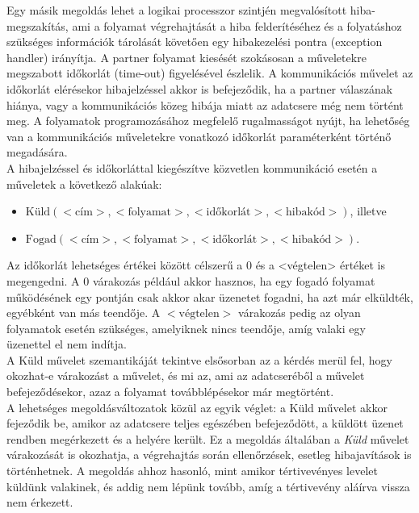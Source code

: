 \documentclass[tikz,12pt,margin=0px]{article}
\begin{document}
    \noindent Egy másik megoldás lehet a logikai processzor szintjén megvalósított hiba-megszakítás, ami a folyamat végrehajtását a hiba felderítéséhez és a folyatáshoz szükséges információk tárolását követően egy hibakezelési pontra (exception handler) irányítja. A partner folyamat kiesését szokásosan a műveletekre megszabott időkorlát (time-out) figyelésével észlelik. A kommunikációs művelet az időkorlát elérésekor hibajelzéssel akkor is befejeződik, ha a partner válaszának hiánya, vagy a kommunikációs közeg hibája miatt az adatcsere még nem történt meg. A folyamatok programozásához megfelelő rugalmasságot nyújt, ha lehetőség van a kommunikációs műveletekre vonatkozó időkorlát paraméterként történő megadására.\\
\newpage
    \noindent A hibajelzéssel és időkorláttal kiegészítve közvetlen kommunikáció esetén a műveletek a következő alakúak:
    \begin{itemize}[topsep=8pt,itemsep=4pt,partopsep=4pt, parsep=4pt]
        \item $\text{Küld}(<\text{cím}>,<\text{folyamat}>,<\text{időkorlát}>, <\text{hibakód}>)$, illetve
        \item $\text{Fogad}(<\text{cím}>,<\text{folyamat}>,<\text{időkorlát}>,<\text{hibakód}>)$.\\
    \end{itemize}

    \noindent Az időkorlát lehetséges értékei között célszerű a 0 és a <végtelen> értéket is megengedni. A 0 várakozás például akkor hasznos, ha egy fogadó folyamat működésének egy pontján csak akkor akar üzenetet fogadni, ha azt már elküldték, egyébként van más teendője. A $<\text{végtelen}>$ várakozás pedig az olyan folyamatok esetén szükséges, amelyiknek nincs teendője, amíg valaki egy üzenettel el nem indítja.\\

    \noindent A Küld művelet szemantikáját tekintve elsősorban az a kérdés merül fel, hogy okozhat-e várakozást a művelet, és mi az, ami az adatcseréből a művelet befejeződésekor, azaz a folyamat továbblépésekor már megtörtént.\\

    \noindent A lehetséges megoldásváltozatok közül az egyik véglet: a Küld művelet akkor fejeződik be, amikor az adatcsere teljes egészében befejeződött, a küldött üzenet rendben megérkezett és a helyére került. Ez a megoldás általában a \emph{Küld} művelet várakozását is okozhatja, a végrehajtás során ellenőrzések, esetleg hibajavítások is történhetnek. A megoldás ahhoz hasonló, mint amikor tértivevényes levelet küldünk valakinek, és addig nem lépünk tovább, amíg a tértivevény aláírva vissza nem érkezett.\\
\end{document}
